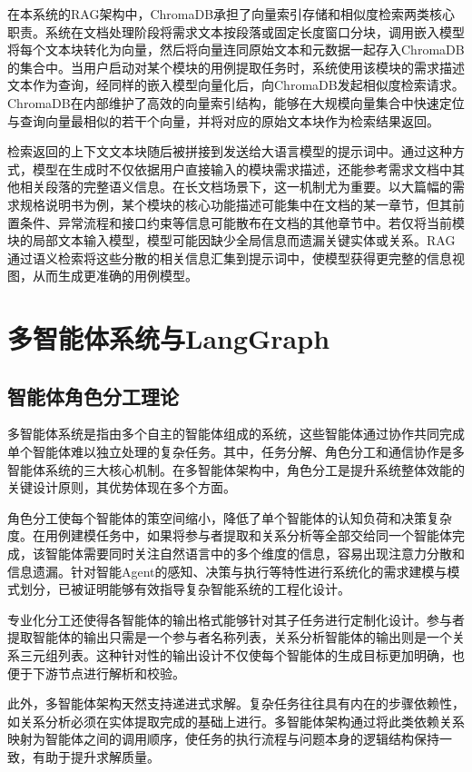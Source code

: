 在本系统的RAG架构中，ChromaDB承担了向量索引存储和相似度检索两类核心职责。系统在文档处理阶段将需求文本按段落或固定长度窗口分块，调用嵌入模型将每个文本块转化为向量，然后将向量连同原始文本和元数据一起存入ChromaDB的集合中。当用户启动对某个模块的用例提取任务时，系统使用该模块的需求描述文本作为查询，经同样的嵌入模型向量化后，向ChromaDB发起相似度检索请求。ChromaDB在内部维护了高效的向量索引结构，能够在大规模向量集合中快速定位与查询向量最相似的若干个向量，并将对应的原始文本块作为检索结果返回。

检索返回的上下文文本块随后被拼接到发送给大语言模型的提示词中。通过这种方式，模型在生成时不仅依据用户直接输入的模块需求描述，还能参考需求文档中其他相关段落的完整语义信息。在长文档场景下，这一机制尤为重要。以大篇幅的需求规格说明书为例，某个模块的核心功能描述可能集中在文档的某一章节，但其前置条件、异常流程和接口约束等信息可能散布在文档的其他章节中。若仅将当前模块的局部文本输入模型，模型可能因缺少全局信息而遗漏关键实体或关系。RAG通过语义检索将这些分散的相关信息汇集到提示词中，使模型获得更完整的信息视图，从而生成更准确的用例模型。

\section{多智能体系统与LangGraph}

\subsection{智能体角色分工理论}

多智能体系统是指由多个自主的智能体组成的系统，这些智能体通过协作共同完成单个智能体难以独立处理的复杂任务。其中，任务分解、角色分工和通信协作是多智能体系统的三大核心机制。在多智能体架构中，角色分工是提升系统整体效能的关键设计原则，其优势体现在多个方面。

角色分工使每个智能体的策空间缩小，降低了单个智能体的认知负荷和决策复杂度。在用例建模任务中，如果将参与者提取和关系分析等全部交给同一个智能体完成，该智能体需要同时关注自然语言中的多个维度的信息，容易出现注意力分散和信息遗漏。针对智能Agent的感知、决策与执行等特性进行系统化的需求建模与模式划分，已被证明能够有效指导复杂智能系统的工程化设计\cite{xiao2026problemframes, hong2024metagpt, li2026aiagent}。

专业化分工还使得各智能体的输出格式能够针对其子任务进行定制化设计。参与者提取智能体的输出只需是一个参与者名称列表，关系分析智能体的输出则是一个关系三元组列表。这种针对性的输出设计不仅使每个智能体的生成目标更加明确，也便于下游节点进行解析和校验。

此外，多智能体架构天然支持递进式求解。复杂任务往往具有内在的步骤依赖性，如关系分析必须在实体提取完成的基础上进行。多智能体架构通过将此类依赖关系映射为智能体之间的调用顺序，使任务的执行流程与问题本身的逻辑结构保持一致，有助于提升求解质量。

